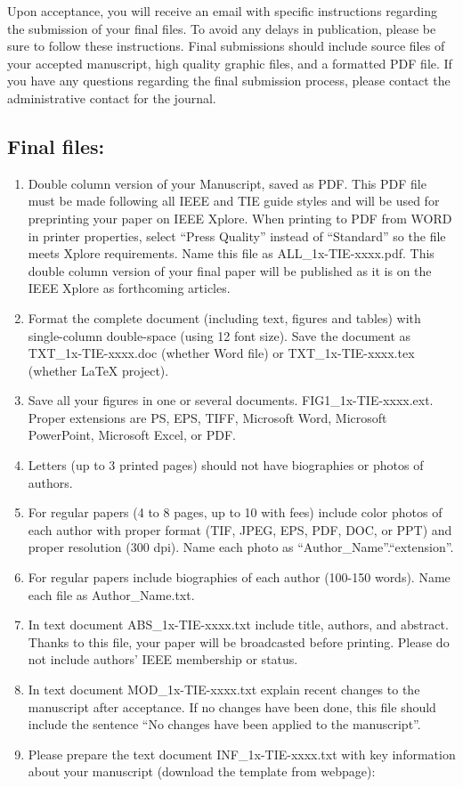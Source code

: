 \documentclass[journal]{IEEEtranTIE}
\begin{document}
Upon acceptance, you will receive an email with specific instructions regarding the submission of your final files.  To avoid any delays in publication, please be sure to follow these instructions. Final submissions should include source files of your accepted manuscript, high quality graphic files, and a formatted PDF file. If you have any questions regarding the final submission process, please contact the administrative contact for the journal.

\subsection{Final files:}

\begin{enumerate}[1)]
	\item Double column version of your Manuscript, saved as PDF. This PDF file must be made following all IEEE and TIE guide styles and will be used for preprinting your paper on IEEE Xplore. When printing to PDF from WORD in printer properties, select  ``Press Quality'' instead of ``Standard'' so the file meets Xplore requirements. Name this file as ALL\_1x-TIE-xxxx.pdf. This double column version of your final paper will be published as it is on the IEEE Xplore as forthcoming articles.
	\item Format the complete document (including text, figures and tables) with single-column double-space (using 12 font size). Save the document as TXT\_1x-TIE-xxxx.doc (whether Word file) or TXT\_1x-TIE-xxxx.tex (whether LaTeX project).
	\item Save all your figures in one or several documents. FIG1\_1x-TIE-xxxx.ext. Proper extensions are PS, EPS, TIFF, Microsoft Word, Microsoft PowerPoint, Microsoft Excel, or PDF.
	\item Letters (up to 3 printed pages) should not have biographies or photos of authors.
	\item For regular papers (4 to 8 pages, up to 10 with fees) include color photos of each author with proper format (TIF, JPEG, EPS, PDF, DOC, or PPT) and proper resolution (300 dpi). Name each photo as ``Author\_Name''.``extension''.
	\item For regular papers include biographies of each author (100-150 words). Name each file as Author\_Name.txt.
	\item In text document ABS\_1x-TIE-xxxx.txt include title, authors, and abstract. Thanks to this file, your paper will be broadcasted before printing. Please do not include authors' IEEE membership or status.
	\item In text document MOD\_1x-TIE-xxxx.txt explain recent changes to the manuscript after acceptance. If no changes have been done, this file should include the sentence ``No changes have been applied to the manuscript''.
	\item Please prepare the text document INF\_1x-TIE-xxxx.txt with key information about your manuscript (download the template from webpage):
	

\end{enumerate}
\end{document}
